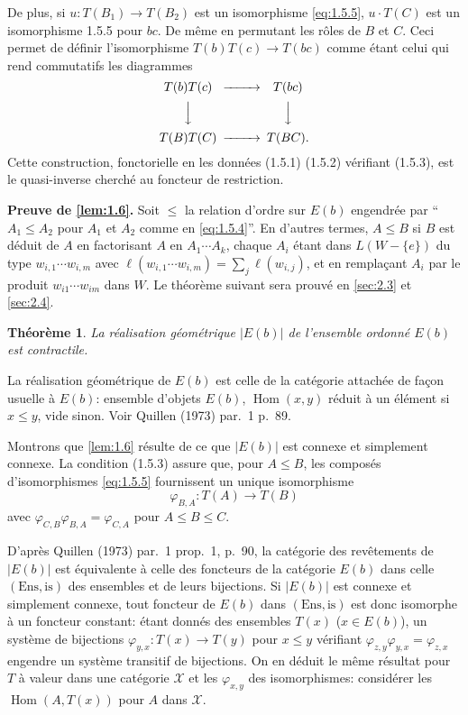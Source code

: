\documentclass[11pt,a4paper]{article}
\theoremstyle{plain}
\newtheorem{theorem}{Th\'eor\`eme}[section]
\theoremstyle{definition}
\DeclareMathOperator{\Hom}{Hom}
\newcommand{\cX}{\mathscr{X}}
\begin{document}
De plus, si $u : T(B_1) \to T(B_2)$ est un isomorphisme \eqref{eq:1.5.5}, $u \cdot T(C)$ est un isomorphisme 1.5.5 pour $bc$. De m\^eme en permutant les r\^oles de $B$ et $C$. Ceci permet de d\'efinir l'isomorphisme $T(b)T(c) \to T(bc)$ comme \'etant celui qui rend commutatifs les diagrammes
\[
\begin{CD}
T(b) T(c) @>>> T(bc) \\
@VVV @VVV \\
T(B) T(C) @>>> T(BC).
\end{CD}
\]
Cette construction, fonctorielle en les donn\'ees (1.5.1) (1.5.2) v\'erifiant (1.5.3), est le quasi-inverse cherch\'e au foncteur de restriction.

\noindent\textbf{Preuve de \ref{lem:1.6}.} Soit $\leq$ la relation d'ordre sur $E(b)$ engendr\'ee par ``$A_1 \leq A_2$ pour $A_1$ et $A_2$ comme en \eqref{eq:1.5.4}''. En d'autres termes, $A \leq B$ si $B$ est d\'eduit de $A$ en factorisant $A$ en $A_1 \cdots A_k$, chaque $A_i$ \'etant dans $L(W - \{e\})$ du type $w_{i,1} \cdots w_{i,m}$ avec $\ell(w_{i,1} \cdots w_{i,m}) = \sum_j \ell(w_{i,j})$, et en rempla\c{c}ant $A_i$ par le produit $w_{i1} \cdots w_{im}$ dans $W$. Le th\'eor\`eme suivant sera prouv\'e en \ref{sec:2.3} et \ref{sec:2.4}.

\begin{theorem}\label{thm:1.7}
La r\'ealisation g\'eom\'etrique $|E(b)|$ de l'ensemble ordonn\'e $E(b)$ est contractile.
\end{theorem}

La r\'ealisation g\'eom\'etrique de $E(b)$ est celle de la cat\'egorie attach\'ee de fa\c{c}on usuelle \`a $E(b)$: ensemble d'objets $E(b)$, $\Hom(x,y)$ r\'eduit \`a un \'el\'ement si $x \leq y$, vide sinon. Voir Quillen (1973) par.~1 p.~89.

Montrons que \ref{lem:1.6} r\'esulte de ce que $|E(b)|$ est connexe et simplement connexe. La condition (1.5.3) assure que, pour $A \leq B$, les compos\'es d'isomorphismes \eqref{eq:1.5.5} fournissent un unique isomorphisme
\[
\varphi_{B,A} : T(A) \to T(B)
\]
avec $\varphi_{C,B} \varphi_{B,A} = \varphi_{C,A}$ pour $A \leq B \leq C$.

D'apr\`es Quillen (1973) par.~1 prop.~1, p.~90, la cat\'egorie des rev\^etements de $|E(b)|$ est \'equivalente \`a celle des foncteurs de la cat\'egorie $E(b)$ dans celle $(\text{Ens}, \text{is})$ des ensembles et de leurs bijections. Si $|E(b)|$ est connexe et simplement connexe, tout foncteur de $E(b)$ dans $(\text{Ens}, \text{is})$ est donc isomorphe \`a un foncteur constant: \'etant donn\'es des ensembles $T(x)$ ($x \in E(b)$), un syst\`eme de bijections $\varphi_{y,x} : T(x) \to T(y)$ pour $x \leq y$ v\'erifiant $\varphi_{z,y} \varphi_{y,x} = \varphi_{z,x}$ engendre un syst\`eme transitif de bijections. On en d\'eduit le m\^eme r\'esultat pour $T$ \`a valeur dans une cat\'egorie $\cX$ et les $\varphi_{x,y}$ des isomorphismes: consid\'erer les $\Hom(A, T(x))$ pour $A$ dans $\cX$.
\end{document}
